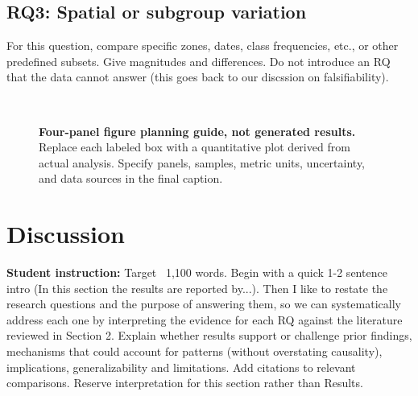 \documentclass[11pt,letterpaper]{article}
\newcommand{\guide}[1]{\par\begingroup\color{blue!60!black}\small\textbf{Student
instruction:} #1\par\endgroup}
\begin{document}
\subsection{RQ3: Spatial or subgroup variation}
For this question, compare specific zones, dates, class frequencies, etc., or other predefined
subsets. Give magnitudes and differences. Do not introduce an RQ that the
data cannot answer (this goes back to our discssion on falsifiability).
\begin{figure}[htbp]\centering
\begin{minipage}[t]{0.47\linewidth}\centering{}\end{minipage}\hfill
\begin{minipage}[t]{0.47\linewidth}\centering{}\end{minipage}\\[0.6em]
\begin{minipage}[t]{0.47\linewidth}\centering{}\end{minipage}\hfill
\begin{minipage}[t]{0.47\linewidth}\centering{}\end{minipage}
\caption{\textbf{Four-panel figure planning guide, not generated results.} Replace each
labeled box with a quantitative plot derived from actual analysis. Specify panels,
samples, metric units, uncertainty, and data sources in the final
caption.}\label{fig:panels}\end{figure}

\section{Discussion}
\guide{Target ~1,100 words. Begin with a quick 1-2 sentence intro (In this section the results are reported by...). 
Then I like to restate the research questions and the purpose of
answering them, so we can systematically address each one by interpreting the evidence for each RQ 
against the literature reviewed in
Section 2. Explain whether results support or challenge prior findings, mechanisms that
could account for patterns (without overstating causality), implications, generalizability
and limitations. Add citations to relevant comparisons. Reserve interpretation for this
section rather than Results.}
\end{document}

